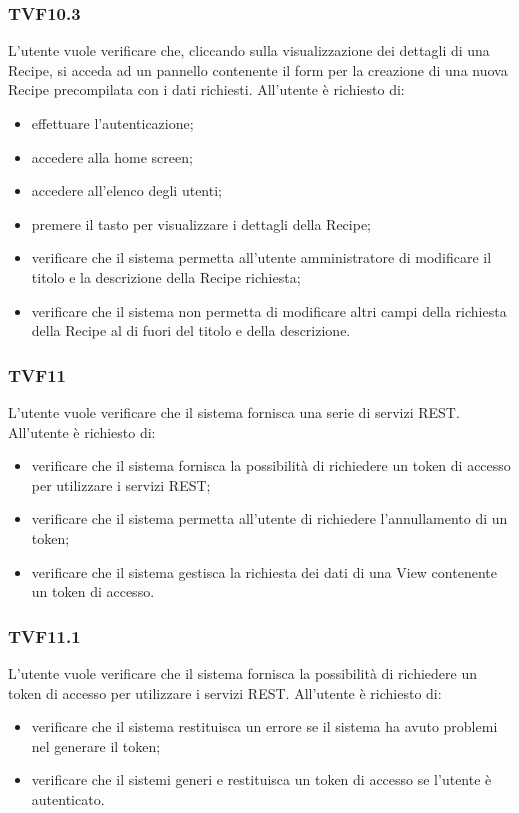 		\subsubsection{TVF10.3}
			L'utente vuole verificare che, cliccando sulla visualizzazione dei dettagli di una Recipe, si acceda ad un pannello contenente il form per la creazione di una nuova Recipe precompilata con i dati richiesti. All'utente è richiesto di:
			\begin{itemize}
				\item effettuare l'autenticazione;
				\item accedere alla home screen;
				\item accedere all'elenco degli utenti;
				\item premere il tasto per visualizzare i dettagli della Recipe;
				\item verificare che il sistema permetta all'utente amministratore di modificare il titolo e la descrizione della Recipe richiesta;
				\item verificare che il sistema non permetta di modificare altri campi della richiesta della Recipe al di fuori del titolo e della descrizione.
			\end{itemize}
			
		\subsubsection{TVF11}
			L'utente vuole verificare che il sistema fornisca una serie di servizi REST. All'utente è richiesto di:
			\begin{itemize}
				\item verificare che il sistema fornisca la possibilità di richiedere un token di accesso per utilizzare i servizi REST;
				\item verificare che il sistema permetta all'utente di richiedere l'annullamento di un token;
				\item verificare che il sistema gestisca la richiesta dei dati di una View contenente un token di accesso.
			\end{itemize}
			
		\subsubsection{TVF11.1}
			L'utente vuole verificare che il sistema fornisca la possibilità di richiedere un token di accesso per utilizzare i servizi REST. All'utente è richiesto di:
			\begin{itemize}
				\item verificare che il sistema restituisca un errore se il sistema ha avuto problemi nel generare il token;
				\item verificare che il sistemi generi e restituisca un token di accesso se l'utente è autenticato.
			\end{itemize}
			
